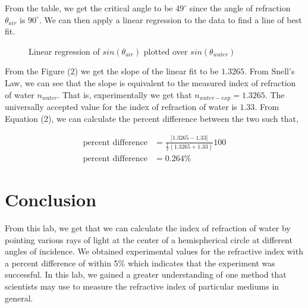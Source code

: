 \documentclass[12pt]{article}
\begin{document}
From the table, we get the critical angle to be $49^{\circ}$ since the angle of refraction $\theta_{air}$ is $90^{\circ}$. We can then apply a linear regression to the data to find a line of best fit.

\begin{figure}[H]
    \centering

    \caption[10pt]{Linear regression of $sin(\theta_{air})$ plotted over $sin(\theta_{water})$}

\end{figure}

From the Figure (2) we get the slope of the linear fit to be $1.3265$. From Snell's Law, we can see that the slope is equivalent to the measured index of refraction of water $n_{water}$. That is, experimentally we get that $n_{water-exp} = 1.3265$. The universally accepted value for the index of refraction of water is $1.33$. From Equation (2), we can calculate the percent difference between the two such that,

\begin{equation*}
    \begin{split}
        \text{percent difference} &= \frac{|1.3265 - 1.33|}{\frac{1}{2}(1.3265 + 1.33)}100 \\
        \text{percent difference} &= 0.264 \%
    \end{split}
\end{equation*}

\section{Conclusion}
From this lab, we get that we can calculate the index of refraction of water by pointing various rays of light at the center of a hemispherical circle at different angles of incidence. We obtained experimental values for the refractive index with a percent difference of within 5\% which indicates that the experiment was successful. In this lab, we gained a greater understanding of one method that scientists may use to measure the refractive index of particular mediums in general.
\end{document}
